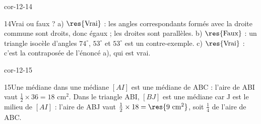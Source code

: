 \begin{blocLivre}{cor-12-14}\begin{corrige}{14}{Vrai ou faux ?}
a) $\res{\text{Vrai}}$ : les angles correspondants formés avec la droite commune sont droits, donc égaux ; les droites sont parallèles. b) $\res{\text{Faux}}$ : un triangle isocèle d’angles $74^\circ$, $53^\circ$ et $53^\circ$ est un contre-exemple. c) $\res{\text{Vrai}}$ : c’est la contraposée de l’énoncé a), qui est vrai.
\label{fig-cor-12-14}
\end{corrige}\end{blocLivre}
\begin{blocLivre}{cor-12-15}\begin{corrige}{15}{Une médiane dans une médiane}
$[AI]$ est une médiane de ABC : l’aire de ABI vaut $\frac12\times36=18$ cm$^2$. Dans le triangle ABI, $[BJ]$ est une médiane car J est le milieu de $[AI]$ : l’aire de ABJ vaut $\frac12\times18=\res{9\ \mathrm{cm}^2}$, soit $\frac14$ de l’aire de ABC.
\label{fig-cor-12-15}
\end{corrige}\end{blocLivre}
